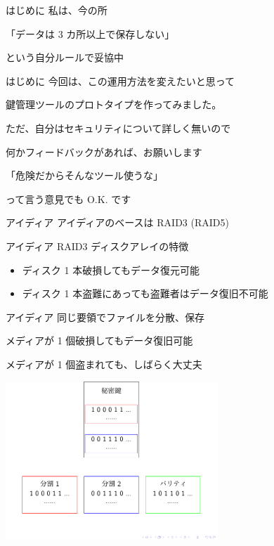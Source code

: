 \begin{frame}{はじめに}{}
  私は、今の所
  \vspace{1cm}

  「データは 3 カ所以上で保存しない」
  \vspace{1cm}

  という自分ルールで妥協中
\end{frame}

\begin{frame}{はじめに}{}
  今回は、この運用方法を変えたいと思って

  鍵管理ツールのプロトタイプを作ってみました。
  \vspace{1cm}

  ただ、自分はセキュリティについて詳しく無いので

  何かフィードバックがあれば、お願いします
  \vspace{1cm}

  「危険だからそんなツール使うな」

  って言う意見でも O.K. です
\end{frame}

\begin{frame}{アイディア}{}
  アイディアのベースは RAID3 (RAID5)
\end{frame}

\begin{frame}{アイディア}{}
  RAID3 ディスクアレイの特徴
  \begin{itemize}
  \item ディスク 1 本破損してもデータ復元可能
  \item ディスク 1 本盗難にあっても盗難者はデータ復旧不可能
  \end{itemize}
\end{frame}

\begin{frame}{アイディア}{}
  同じ要領でファイルを分散、保存

  メディアが 1 個破損してもデータ復旧可能

  メディアが 1 個盗まれても、しばらく大丈夫
  \vspace{1cm}

  \includegraphics[width=8cm]{image201406/split_image.pdf}
\end{frame}

